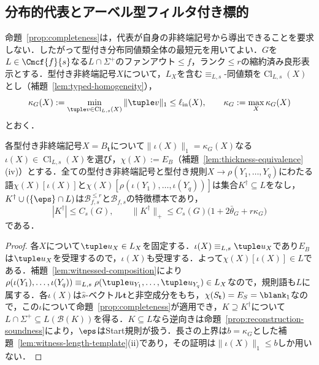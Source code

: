 \subsection{分布的代表とアーベル型フィルタ付き標的}
\label{subsec:short-distributional-representatives}

命題~\ref{prop:completeness}は，代表が自身の非終端記号から導出できることを要求しない．したがって型付き分布同値類全体の最短元を用いてよい．$G$を$L\in\Cmcf{f}{s}$なる$L\cap\Sigma^+$のファンアウト$\le f$，ランク$\le r$の縮約済み良形表示とする．型付き非終端記号$X$について，$L_X$を含む$\equiv_{L,s}$-同値類を$\operatorname{Cl}_{L,s}(X)$とし（補題~\ref{lem:typed-homogeneity}），
\[
 \kappa_G(X):=\min_{\tuple v\in\operatorname{Cl}_{L,s}(X)}\|\tuple v\|_1\le\ell_{\mathrm{in}}(X),\qquad
 \kappa_G:=\max_X\kappa_G(X)
\]
とおく．

\begin{proposition}[緩和した分布的証拠]
\label{prop:mcfg-relaxed-witnesses}
各型付き非終端記号$X=B_{\mathbf t}$について$\|\iota(X)\|_1=\kappa_G(X)$なる$\iota(X)\in\operatorname{Cl}_{L,s}(X)$を選び，$\chi(X):=E_B$（補題~\ref{lem:thickness-equivalence}(iv)）とする．全ての型付き非終端記号と型付き規則$X\to\rho(Y_1,\ldots,Y_q)$にわたる語$\chi(X)[\iota(X)]$と$\chi(X)[\rho(\iota(Y_1),\ldots,\iota(Y_q))]$は集合$K^\dagger\subseteq L$をなし，$K^\dagger\cup(\{\eps\}\cap L)$は$\mathcal B^{\le r}_{f,s}$と$\mathcal B_{f,s}$の特徴標本であり，
\[
 |K^\dagger|\le C_s(G),\qquad
 \|K^\dagger\|_+\le C_s(G)\bigl(1+2\bar\theta_G+r\kappa_G\bigr)
\]
である．
\end{proposition}

\begin{proof}
各$X$について$\tuple u_X\in L_X$を固定する．$\iota(X)\equiv_{L,s}\tuple u_X$であり$E_B$は$\tuple u_X$を受理するので，$\iota(X)$も受理する．よって$\chi(X)[\iota(X)]\in L$である．補題~\ref{lem:witnessed-composition}により$\rho(\iota(Y_1),\ldots,\iota(Y_q))\equiv_{L,s}\rho(\tuple u_{Y_1},\ldots,\tuple u_{Y_q})\in L_X$なので，規則語も$L$に属する．各$\iota(X)$は$\widehat s$-ベクトル$\mathbf t$と非空成分をもち，$\chi(S_{\mathbf t})=E_S=\blank_1$なので，この$\iota$について命題~\ref{prop:completeness}が適用でき，$K\supseteq K^\dagger$について$L\cap\Sigma^+\subseteq L(\mathcal B(K))$を得る．$K\subseteq L$なら逆向きは命題~\ref{prop:reconstruction-soundness}により，$\eps$はStart規則が扱う．長さの上界は$b=\kappa_G$とした補題~\ref{lem:witness-length-template}(ii)であり，その証明は$\|\iota(X)\|_1\le b$しか用いない．
\end{proof}

